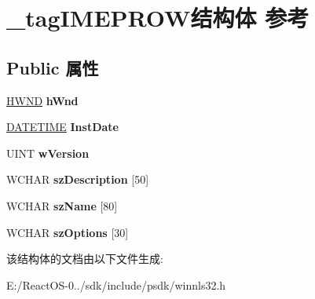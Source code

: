 \hypertarget{struct__tag_i_m_e_p_r_o_w}{}\section{\+\_\+tag\+I\+M\+E\+P\+R\+O\+W结构体 参考}
\label{struct__tag_i_m_e_p_r_o_w}
\subsection*{Public 属性}
\begin{DoxyCompactItemize}
\item 
\mbox{\label{struct__tag_i_m_e_p_r_o_w_a92b850831f569e7e17d9751e88f15618}} 
\hyperlink{interfacevoid}{H\+W\+ND} {\bfseries h\+Wnd}
\item 
\mbox{\label{struct__tag_i_m_e_p_r_o_w_aedb6b1018ba236cc0b640fd2160dc4c4}} 
\hyperlink{struct__tag_d_a_t_e_t_i_m_e}{D\+A\+T\+E\+T\+I\+ME} {\bfseries Inst\+Date}
\item 
\mbox{\label{struct__tag_i_m_e_p_r_o_w_a9ba4a5f319f9266cadd045df90e517ee}} 
U\+I\+NT {\bfseries w\+Version}
\item 
\mbox{\label{struct__tag_i_m_e_p_r_o_w_a97a8f1f10829a5136924d6d6eb4707a1}} 
W\+C\+H\+AR {\bfseries sz\+Description} \mbox{[}50\mbox{]}
\item 
\mbox{\label{struct__tag_i_m_e_p_r_o_w_aee201dd1930426fadcb686047b03b884}} 
W\+C\+H\+AR {\bfseries sz\+Name} \mbox{[}80\mbox{]}
\item 
\mbox{\label{struct__tag_i_m_e_p_r_o_w_a46a8b8402f8737daab4198b8382cf0c7}} 
W\+C\+H\+AR {\bfseries sz\+Options} \mbox{[}30\mbox{]}
\end{DoxyCompactItemize}


该结构体的文档由以下文件生成\+:\begin{DoxyCompactItemize}
\item 
E\+:/\+React\+O\+S-\/0../sdk/include/psdk/winnls32.\+h\end{DoxyCompactItemize}
